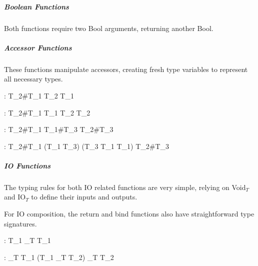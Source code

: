 \documentclass[class=article, crop=false]{standalone}
\begin{document}
\subparagraph{Boolean Functions}

Both functions require two Bool arguments, returning another Bool.



\subparagraph{Accessor Functions}

These functions manipulate accessors, creating fresh type variables to represent all necessary types.

    {\Gamma \vdash {} : T_2\#T_1 \rightarrow T_2 \rightarrow T_1}

    {\Gamma \vdash {} : T_2\#T_1 \rightarrow T_1 \rightarrow T_2 \rightarrow T_2}

    {\Gamma \vdash {} : T_2\#T_1 \rightarrow T_1\#T_3 \rightarrow T_2\#T_3}

    {\Gamma \vdash {} : T_2\#T_1 \rightarrow (T_1 \rightarrow T_3) \rightarrow (T_3 \rightarrow T_1 \rightarrow T_1) \rightarrow T_2\#T_3}

\subparagraph{IO Functions}

The typing rules for both IO related functions are very simple, relying on Void$_T$ and IO$_T$ to define their inputs and outputs.



For IO composition, the return and bind functions also have straightforward type signatures.

    {\Gamma \vdash {} : T_1 \rightarrow {}_T \;  T_1}

    {\Gamma \vdash {} : _T \;  T_1 \rightarrow (T_1 \rightarrow {}_T \;  T_2) \rightarrow {}_T \;  T_2}
\end{document}
